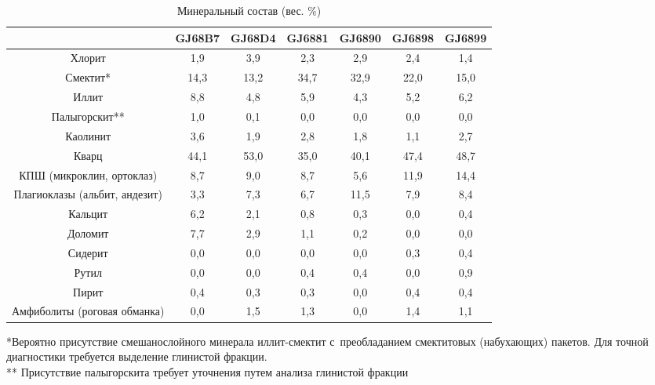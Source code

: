 \begin{table}[]
    \centering
  \begin{threeparttable}
  \caption{Минеральный состав (вес. \%)}
  \label{tab:mineral}
    \begin{tabular}{|c|c|c|c|c|c|c|}
        \hline
                                  & GJ68B7 & GJ68D4 & GJ6881 & GJ6890 & GJ6898 & GJ6899 \\ \hline
    Хлорит                        & 1,9  & 3,9  & 2,3  & 2,9  & 2,4  & 1,4  \\ \hline
    Смектит*                       & 14,3 & 13,2 & 34,7 & 32,9 & 22,0 & 15,0 \\ \hline
    Иллит                         & 8,8  & 4,8  & 5,9  & 4,3  & 5,2  & 6,2  \\ \hline
    Палыгорскит**                   & 1,0  & 0,1  & 0,0  & 0,0  & 0,0  & 0,0  \\ \hline
    Каолинит                      & 3,6  & 1,9  & 2,8  & 1,8  & 1,1  & 2,7  \\ \hline
    Кварц                         & 44,1 & 53,0 & 35,0 & 40,1 & 47,4 & 48,7 \\ \hline
    КПШ (микроклин, ортоклаз)     & 8,7  & 9,0  & 8,7  & 5,6  & 11,9 & 14,4 \\ \hline
    Плагиоклазы (альбит, андезит) & 3,3  & 7,3  & 6,7  & 11,5 & 7,9  & 8,4  \\ \hline
    Кальцит                       & 6,2  & 2,1  & 0,8  & 0,3  & 0,0  & 0,4  \\ \hline
    Доломит                       & 7,7  & 2,9  & 1,1  & 0,2  & 0,0  & 0,0  \\ \hline
    Сидерит                       & 0,0  & 0,0  & 0,0  & 0,0  & 0,3  & 0,4  \\ \hline
    Рутил                         & 0,0  & 0,0  & 0,4  & 0,4  & 0,0  & 0,9  \\ \hline
    Пирит                         & 0,4  & 0,3  & 0,3  & 0,0  & 0,4  & 0,4  \\ \hline
    Амфиболиты (роговая обманка)  & 0,0  & 1,5  & 1,3  & 0,0  & 1,4  & 1,1  \\ \hline
    \end{tabular}
    \raggedright 
    *Вероятно присутствие смешанослойного минерала иллит-смектит с~преобладанием смектитовых 
    (набухающих) пакетов. 
    Для точной диагностики требуется выделение глинистой фракции.
    \\
    ** Присутствие палыгорскита требует уточнения путем анализа глинистой фракции
    \end{threeparttable}
    \end{table}

